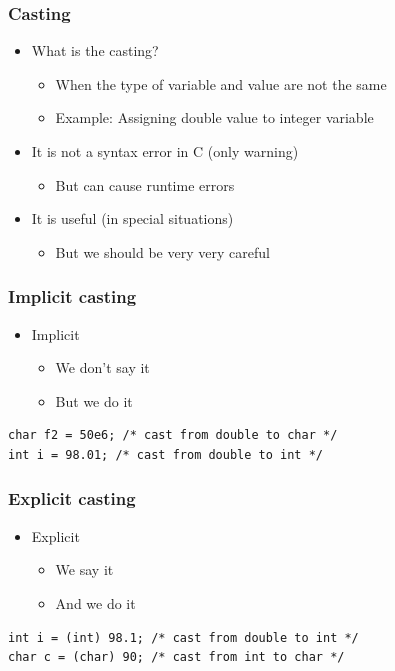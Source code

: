 \documentclass{../c-lecture}
\begin{document}
\begin{frame}
  \frametitle{Casting}
  \begin{itemize}
    \item What is the casting?
    \begin{itemize}
      \item
        When the type of variable and value
        {\color{Cyan} are not the same}
      \item Example: Assigning double value to integer variable
    \end{itemize}
    \item It is not a syntax error in C (only warning)
    \begin{itemize}
      \item But can cause {\color{Orange} runtime errors}
    \end{itemize}
    \item It is useful (in special situations)
    \begin{itemize}
      \item But we should be very very careful
    \end{itemize}
  \end{itemize}
\end{frame}

\begin{frame}[fragile]
  \frametitle{Implicit casting}
  \begin{itemize}
    \item Implicit
    \begin{itemize}
      \item We don’t say it
      \item But we do it
    \end{itemize}
  \end{itemize}
  \begin{verbatim}
char f2 = 50e6; /* cast from double to char */
int i = 98.01; /* cast from double to int */
  \end{verbatim}
\end{frame}

\begin{frame}[fragile]
  \frametitle{Explicit casting}
  \begin{itemize}
    \item Explicit
    \begin{itemize}
      \item We say it
      \item And we do it
    \end{itemize}
  \end{itemize}
  \begin{verbatim}
int i = (int) 98.1; /* cast from double to int */
char c = (char) 90; /* cast from int to char */
  \end{verbatim}
\end{frame}
\end{document}
